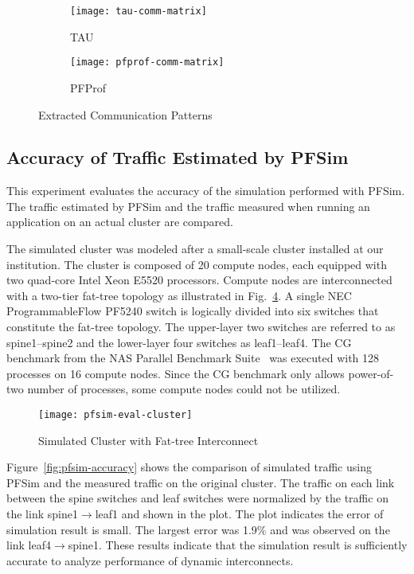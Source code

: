 \begin{figure}
    \centering
    \begin{subfigure}{.49\linewidth}
        \centering
        \texttt{[image: tau-comm-matrix]}
        \caption{TAU}%
        \label{fig:tau-comm-matrix}
    \end{subfigure}
    \begin{subfigure}{.49\linewidth}
        \centering
        \texttt{[image: pfprof-comm-matrix]}
        \caption{PFProf}%
        \label{fig:pfprof-comm-matrix}
    \end{subfigure}
    \caption{Extracted Communication Patterns}%
    \label{fig:profiler-comparison}
\end{figure}

\subsection{Accuracy of Traffic Estimated by PFSim}%
\label{sec:ii-eval-pfsim}

This experiment evaluates the accuracy of the simulation performed with PFSim.
The traffic estimated by PFSim and the traffic measured when running an
application on an actual cluster are compared.

The simulated cluster was modeled after a small-scale cluster installed at our
institution. The cluster is composed of 20 compute nodes, each equipped with
two quad-core Intel Xeon E5520 processors. Compute nodes are interconnected
with a two-tier fat-tree topology as illustrated in
Fig.~\ref{fig:cluster-config}. A single NEC ProgrammableFlow PF5240 switch is
logically divided into six switches that constitute the fat-tree topology.
The upper-layer two switches are referred to as spine1--spine2 and the
lower-layer four switches as leaf1--leaf4. The CG benchmark from the
NAS Parallel Benchmark Suite~\autocite{Bailey1991} was executed with 128
processes on 16 compute nodes. Since the CG benchmark only allows power-of-two
number of processes, some compute nodes could not be utilized.

\begin{figure}
    \centering
    \texttt{[image: pfsim-eval-cluster]}
    \caption{Simulated Cluster with Fat-tree Interconnect}%
    \label{fig:cluster-config}
\end{figure}

Figure~\ref{fig:pfsim-accuracy} shows the comparison of simulated traffic
using PFSim and the measured traffic on the original cluster. The traffic on
each link between the spine switches and leaf switches were normalized by the
traffic on the link spine1$\rightarrow$leaf1 and shown in the plot. The plot
indicates the error of simulation result is small. The largest error was 1.9\%
and was observed on the link leaf4$\rightarrow$spine1. These results indicate
that the simulation result is sufficiently accurate to analyze performance of
dynamic interconnects.

